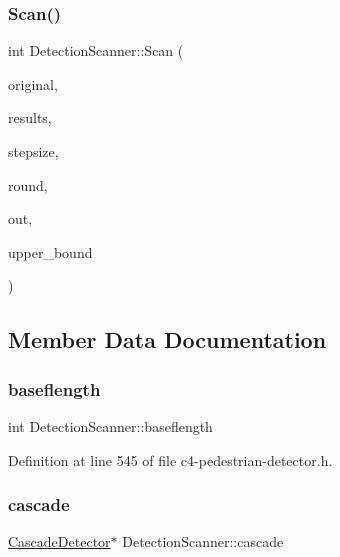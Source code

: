\subsubsection{\texorpdfstring{Scan()}{Scan()}}
{\footnotesize\ttfamily int Detection\+Scanner\+::\+Scan (\begin{DoxyParamCaption}\item[{\mbox{\hyperlink{class_int_image}{Int\+Image}}$<$ double $>$ \&}]{original,  }\item[{std\+::vector$<$ cv\+::\+Rect $>$ \&}]{results,  }\item[{const int}]{stepsize,  }\item[{const int}]{round,  }\item[{std\+::ofstream $\ast$}]{out,  }\item[{const int}]{upper\+\_\+bound }\end{DoxyParamCaption})}



\subsection{Member Data Documentation}
\mbox{\label{class_detection_scanner_aee5791fae7267a2f4a56e429d8842e6e}} 
\subsubsection{\texorpdfstring{baseflength}{baseflength}}
{\footnotesize\ttfamily int Detection\+Scanner\+::baseflength}



Definition at line 545 of file c4-\/pedestrian-\/detector.\+h.

\mbox{\label{class_detection_scanner_a5fd4ac1b6a6c56a95543eca549c26634}} 
\subsubsection{\texorpdfstring{cascade}{cascade}}
{\footnotesize\ttfamily \mbox{\hyperlink{class_cascade_detector}{Cascade\+Detector}}$\ast$ Detection\+Scanner\+::cascade}



